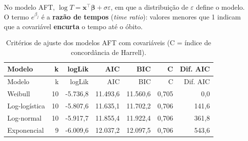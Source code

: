 \documentclass[
  brazilian,
]{article}
\begin{document}
No modelo AFT,
\(\log T = \mathbf{x}^\top\boldsymbol\beta + \sigma\varepsilon\), em que
a distribuição de \(\varepsilon\) define o modelo. O termo
\(e^{\beta_j}\) é a \textbf{razão de tempos} (\emph{time ratio}):
valores menores que 1 indicam que a covariável \textbf{encurta} o tempo
até o óbito.

\begin{longtable}[]{@{}lrrrrrr@{}}
\caption{Critérios de ajuste dos modelos AFT com covariáveis (C = índice
de concordância de Harrell).}\tabularnewline
\toprule\noalign{}
Modelo & k & logLik & AIC & BIC & C & Dif. AIC \\
\midrule\noalign{}
\endfirsthead
\toprule\noalign{}
Modelo & k & logLik & AIC & BIC & C & Dif. AIC \\
\midrule\noalign{}
\endhead
\bottomrule\noalign{}
\endlastfoot
Weibull & 10 & -5.736,8 & 11.493,6 & 11.560,6 & 0,705 & 0,0 \\
Log-logística & 10 & -5.807,6 & 11.635,1 & 11.702,2 & 0,706 & 141,6 \\
Log-normal & 10 & -5.917,7 & 11.855,4 & 11.922,4 & 0,706 & 361,8 \\
Exponencial & 9 & -6.009,6 & 12.037,2 & 12.097,5 & 0,706 & 543,6 \\
\end{longtable}
\end{document}
